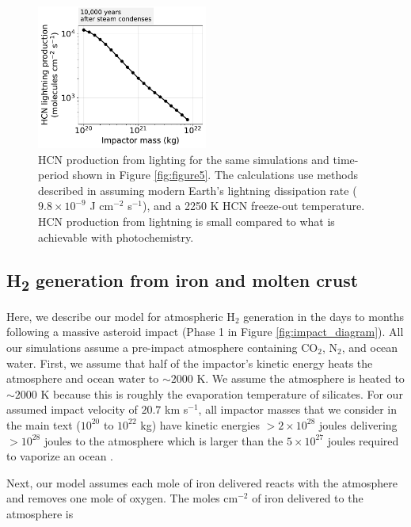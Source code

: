 \begin{figure}
  \centering
  \includegraphics[width=0.5\textwidth]{tex/5impacts/figures/supplement/Figure5_lightning.pdf}
  \caption{HCN production from lighting for the same simulations and time-period shown in Figure \ref{fig:figure5}. The calculations use methods described in \citet{Chameides_1981} assuming modern Earth's lightning dissipation rate ($9.8 \times 10^{-9}$ J cm$^{-2}$ s$^{-1}$), and a 2250 K HCN freeze-out temperature. HCN production from lightning is small compared to what is achievable with photochemistry.}
  \label{fig:figure5_lightning}
\end{figure}

\subsection{H\textsubscript{2} generation from iron and molten crust} \label{sec:phase1_appendix}

Here, we describe our model for atmospheric H$_2$ generation in the days to months following a massive asteroid impact (Phase 1 in Figure \ref{fig:impact_diagram}). All our simulations assume a pre-impact atmosphere containing CO$_2$, N$_2$, and ocean water. First, we assume that half of the impactor's kinetic energy heats the atmosphere and ocean water to $\sim 2000$ K. We assume the atmosphere is heated to $\sim 2000$ K because this is roughly the evaporation temperature of silicates. For our assumed impact velocity of $20.7$ km s$^{-1}$, all impactor masses that we consider in the main text ($10^{20}$ to $10^{22}$ kg) have kinetic energies $> 2 \times 10^{28}$ joules delivering $> 10^{28}$ joules to the atmosphere which is larger than the $5 \times 10^{27}$ joules required to vaporize an ocean \citep{Sleep_1989}. 

Next, our model assumes each mole of iron delivered reacts with the atmosphere and removes one mole of oxygen. The moles cm$^{-2}$ of iron delivered to the atmosphere is

